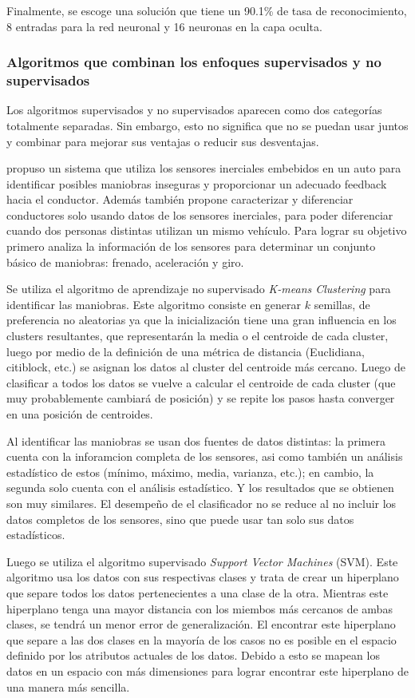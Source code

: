 Finalmente, se escoge una solución que tiene un 90.1\% de tasa de reconocimiento, 8 entradas para la red neuronal y 16 neuronas en la capa oculta.

\subsubsection{Algoritmos que combinan los enfoques supervisados y no supervisados}

Los algoritmos supervisados y no supervisados aparecen como dos categorías totalmente separadas. Sin embargo, esto no significa que no se puedan usar juntos y combinar para mejorar sus ventajas o reducir sus desventajas.

\citeauthor{6629603} \cite{6629603} propuso un sistema
que utiliza los sensores inerciales embebidos en un auto para identificar posibles maniobras inseguras y proporcionar un adecuado feedback hacia el conductor. Además también propone caracterizar y diferenciar conductores solo usando datos de los sensores inerciales, para poder diferenciar cuando dos personas distintas utilizan un mismo vehículo. Para lograr su objetivo primero analiza la información de los sensores para determinar un conjunto básico de maniobras: frenado, aceleración y giro.


Se utiliza el algoritmo de aprendizaje no supervisado {\it K-means Clustering} para identificar las maniobras. Este algoritmo consiste en generar $k$ semillas, de preferencia no aleatorias ya que la inicialización tiene una gran influencia en los clusters resultantes, que representarán la media o el centroide de cada cluster, luego por medio de la definición de una métrica de distancia (Euclidiana, citiblock, etc.) se asignan los datos al cluster del centroide más cercano. Luego de clasificar a todos los datos se vuelve a calcular el centroide de cada cluster (que muy probablemente cambiará de posición) y se repite los pasos hasta converger en una posición de centroides.


Al identificar las maniobras se usan dos fuentes de datos distintas: la primera cuenta con la inforamcion completa de los sensores, asi como también un análisis estadístico de estos (mínimo, máximo, media, varianza, etc.); en cambio, la segunda solo cuenta con el análisis estadístico. Y los resultados que se obtienen son muy similares. El desempeño de el clasificador no se reduce al no incluir los datos completos de los sensores, sino que puede usar tan solo sus datos estadísticos.

Luego se utiliza el algoritmo supervisado {\it Support Vector Machines} (SVM). Este algoritmo usa los datos con sus respectivas clases y trata de crear un hiperplano que separe todos los datos pertenecientes a una clase de la otra. Mientras este hiperplano tenga una mayor distancia con los miembos más cercanos de ambas clases, se tendrá un menor error de generalización. El encontrar este hiperplano que separe a las dos clases en la mayoría de los casos no es posible en el espacio definido por los atributos actuales de los datos. Debido a esto se mapean los datos en un espacio con más dimensiones para lograr encontrar este hiperplano de una manera más sencilla.

